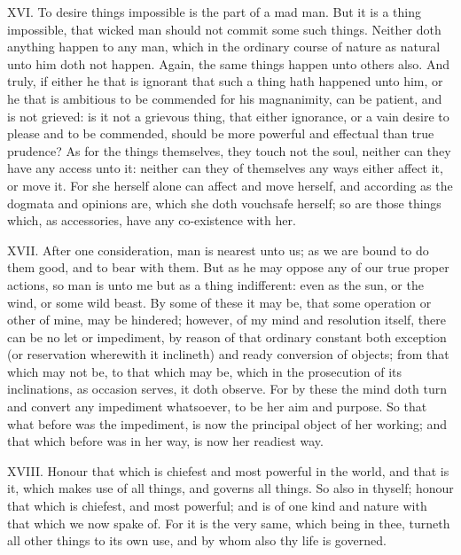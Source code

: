 XVI. To desire things impossible is the part of a mad man. But it is a
thing impossible, that wicked man should not commit some such things.
Neither doth anything happen to any man, which in the ordinary course of
nature as natural unto him doth not happen. Again, the same things happen
unto others also. And truly, if either he that is ignorant that such a
thing hath happened unto him, or he that is ambitious to be commended for
his magnanimity, can be patient, and is not grieved: is it not a grievous
thing, that either ignorance, or a vain desire to please and to be
commended, should be more powerful and effectual than true prudence? As
for the things themselves, they touch not the soul, neither can they have
any access unto it: neither can they of themselves any ways either affect
it, or move it. For she herself alone can affect and move herself, and
according as the dogmata and opinions are, which she doth vouchsafe
herself; so are those things which, as accessories, have any co-existence
with her.

XVII. After one consideration, man is nearest unto us; as we are bound
to do them good, and to bear with them. But as he may oppose any of our
true proper actions, so man is unto me but as a thing indifferent: even as
the sun, or the wind, or some wild beast. By some of these it may be, that
some operation or other of mine, may be hindered; however, of my mind and
resolution itself, there can be no let or impediment, by reason of that
ordinary constant both exception (or reservation wherewith it inclineth)
and ready conversion of objects; from that which may not be, to that which
may be, which in the prosecution of its inclinations, as occasion serves,
it doth observe. For by these the mind doth turn and convert any
impediment whatsoever, to be her aim and purpose. So that what before was
the impediment, is now the principal object of her working; and that which
before was in her way, is now her readiest way.

XVIII. Honour that which is chiefest and most powerful in the world, and
that is it, which makes use of all things, and governs all things. So also
in thyself; honour that which is chiefest, and most powerful; and is of
one kind and nature with that which we now spake of. For it is the very
same, which being in thee, turneth all other things to its own use, and by
whom also thy life is governed.

